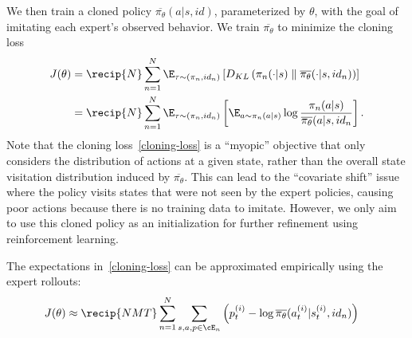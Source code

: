 \documentclass[12pt]{article}
\newcommand{\pibar}{\overline{\pi_\theta}}
\begin{document}
We then train a cloned policy $\pibar(a|s, id)$, parameterized by $\theta$,
with the goal of imitating each expert's observed behavior.
We train $\pibar$ to minimize the cloning loss
\begin{equation}\begin{split}
J(\theta)
&= \recip{N} \sum_{n=1}^N \E_{\tau \sim (\pi_n, id_n)} \left[
D_{KL} \left(\pi_n(\cdot|s) \parallel \pibar(\cdot|s, id_n)\right)
\right] \\
&= \recip{N} \sum_{n=1}^N \E_{\tau \sim (\pi_n, id_n)} \left[
\E_{a \sim \pi_n(a|s)}
\log \frac{\pi_n(a|s)}{\pibar(a|s,id_n}
\right].
\label{cloning-loss}
\end{split}\end{equation}
Note that the cloning loss~\eqref{cloning-loss} is a ``myopic'' objective
that only considers the distribution of actions at a given state,
rather than the overall state visitation distribution induced by $\pibar$.
This can lead to the ``covariate shift'' issue where the policy visits states that were not seen by the expert policies,
causing poor actions because there is no training data to imitate.
However, we only aim to use this cloned policy as an initialization for further refinement using reinforcement learning.

The expectations in~\eqref{cloning-loss} can be approximated empirically using the expert rollouts:
\begin{equation}\begin{split}
J(\theta)
&\approx
\recip{NMT} \sum_{n=1}^N \sum_{s,a,p \in \cE_n} \left( p_t^{(i)} - \log \pibar(a_t^{(i)}|s_t^{(i)},id_n) \right)
\label{cloning-loss-empirical}
\end{split}\end{equation}




{}
\end{document}
